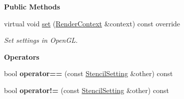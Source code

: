\begin{Indent}\textbf{ Public Methods}\par
\begin{DoxyCompactItemize}
\item 
\mbox{\label{classrev_1_1_stencil_setting_a03cca571d20315b471d7ab38e267cc42}} 
virtual void \mbox{\hyperlink{classrev_1_1_stencil_setting_a03cca571d20315b471d7ab38e267cc42}{set}} (\mbox{\hyperlink{classrev_1_1_render_context}{Render\+Context}} \&context) const override
\begin{DoxyCompactList}\small\item\em Set settings in Open\+GL. \end{DoxyCompactList}\end{DoxyCompactItemize}
\end{Indent}
\begin{Indent}\textbf{ Operators}\par
\begin{DoxyCompactItemize}
\item 
\mbox{\label{classrev_1_1_stencil_setting_a3d66b6fe4d1d139753ab0a71f44fcba7}} 
bool {\bfseries operator==} (const \mbox{\hyperlink{classrev_1_1_stencil_setting}{Stencil\+Setting}} \&other) const
\item 
\mbox{\label{classrev_1_1_stencil_setting_a678934e1f7bd36b1ad068bb98051a13e}} 
bool {\bfseries operator!=} (const \mbox{\hyperlink{classrev_1_1_stencil_setting}{Stencil\+Setting}} \&other) const
\end{DoxyCompactItemize}
\end{Indent}
